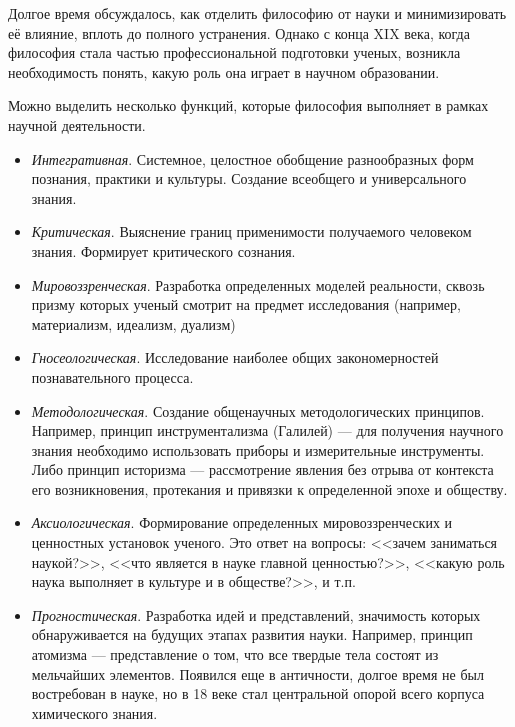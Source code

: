 Долгое время обсуждалось, как отделить философию от науки и минимизировать её влияние, вплоть до полного устранения. Однако с конца XIX века, когда философия стала частью профессиональной подготовки ученых, возникла необходимость понять, какую роль она играет в научном образовании. 

Можно выделить несколько функций, которые философия выполняет в рамках научной деятельности.
\begin{itemize}
    \item \textit{Интегративная}. 
    Системное, целостное обобщение разнообразных форм познания, практики и культуры. Создание всеобщего и универсального знания.

    \item \textit{Критическая}. 
    Выяснение границ применимости получаемого человеком знания. Формирует критического сознания.  

    \item \textit{Мировоззренческая}. 
    Разработка определенных моделей реальности, сквозь призму которых ученый смотрит на предмет исследования (например, материализм, идеализм, дуализм)

    \item \textit{Гносеологическая}. 
    Исследование наиболее общих закономерностей познавательного процесса.

    \item \textit{Методологическая}. 
    Создание общенаучных методологических принципов. 
    Например, принцип инструментализма (Галилей) — для получения научного знания необходимо использовать приборы и измерительные инструменты.
    Либо принцип историзма — рассмотрение явления без отрыва от контекста его возникновения, протекания и привязки к определенной эпохе и обществу.
    
    \item \textit{Аксиологическая}. 
    Формирование определенных мировоззренческих и ценностных установок ученого. Это ответ на вопросы: <<зачем заниматься наукой?>>, <<что является в науке главной ценностью?>>, <<какую роль наука выполняет 
    в культуре и в обществе?>>, и т.п.

    \item \textit{Прогностическая}. 
    Разработка идей и представлений, значимость которых обнаруживается на будущих этапах развития науки. 
    Например, принцип атомизма — представление о том, что все твердые тела состоят из мельчайших элементов. Появился еще в античности, долгое время не был востребован в науке, но в 18 веке стал центральной опорой 
    всего корпуса химического знания. 
\end{itemize}
	
